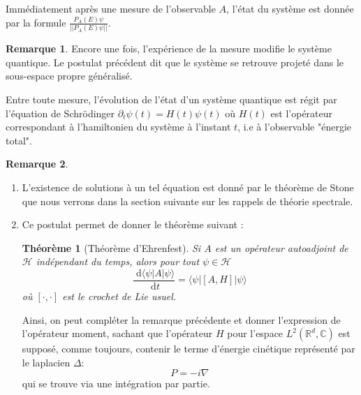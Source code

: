 \documentclass[12pt,openany,a4paper, titlepage]{article}
\newcommand{\f}[2]{\frac{#1}{#2}}
\newcommand{\dd}{\;\mathrm{d}}
\newcommand{\R}{\mathbb{R}}
\newcommand{\C}{\mathbb{C}}
\newcommand{\HH}{\mathcal{H}}
\newtheorem{theo}{Théorème}
\theoremstyle{definition}
\theoremstyle{definition}
\theoremstyle{definition}
\theoremstyle{definition}
\theoremstyle{definition}
\newtheorem{rem}{Remarque}
\theoremstyle{definition}
\begin{document}
\vspace{3mm}
\begin{tcolorbox}[colback=gray!5!white,
                  colframe=gray!80!white,
                  title= Postulat 5 : Principe de réduction du paquet d’onde ]
Immédiatement après une mesure de l'observable $A$, l'état du système est donnée par la formule $\f{P_A(E)\psi}{||P_A(E)\psi||}$.
\end{tcolorbox}
\vspace{3mm}

\begin{rem}
    Encore une fois, l'expérience de la mesure modifie le système quantique. Le postulat précédent dit que le système se retrouve projeté dans le sous-espace propre généralisé. 
\end{rem}

\vspace{3mm}
\begin{tcolorbox}[colback=gray!5!white,
                  colframe=gray!80!white,
                  title= Postulat 6 : Evolution d'un système dans le temps ]
Entre toute mesure, l'évolution de l'état d'un système quantique est régit par l'équation de Schrödinger 
$\partial_t \psi(t) = H(t)\psi(t)$
où $H(t)$ est l'opérateur correspondant à l'hamiltonien du système à l'instant $t$, i.e à l'observable "énergie total".
\end{tcolorbox}
\vspace{3mm}

\begin{rem}
    \begin{enumerate}
        \item[1] L'existence de solutions à un tel équation est donné par le théorème de Stone que nous verrons dans la section suivante sur les rappels de théorie spectrale.
        \item[2] Ce postulat permet de donner le théorème suivant :
        \begin{theo}[Théorème d'Ehrenfest]
        Si $A$ est un opérateur autoadjoint de $\HH$ indépendant du temps, alors pour tout $\psi\in\HH$
        \begin{equation}
            \frac{\dd \langle \psi | A | \psi\rangle}{\dd t} = \langle \psi | [A,H] | \psi\rangle
        \end{equation}
        où $[\cdot,\cdot]$ est le crochet de Lie usuel.
    \end{theo}
    Ainsi, on peut compléter la remarque précédente et donner l'expression de l'opérateur moment, sachant que l'opérateur $H$ pour l'espace $L^2(\R^d,\C)$ est supposé, comme toujours, contenir le terme d'énergie cinétique représenté par le laplacien $\Delta$:
    \begin{equation}
        P = -i\nabla
    \end{equation}
    qui se trouve via une intégration par partie.
    \end{enumerate}
\end{rem}
\end{document}
